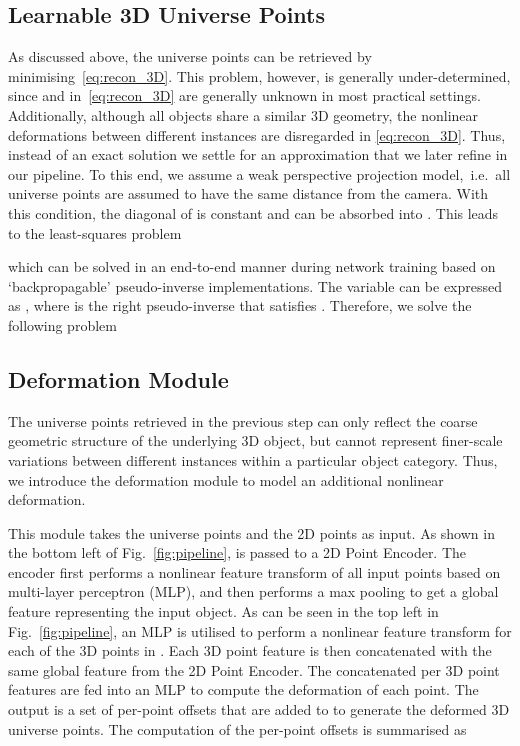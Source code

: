\noindent\subsection{Learnable 3D Universe Points}
As discussed above,
the universe points can be retrieved by minimising~\eqref{eq:recon_3D}.
This problem, however, is generally under-determined, since  and  in~\eqref{eq:recon_3D} are generally unknown in most practical settings.
Additionally, although all objects
share a similar 3D geometry, the nonlinear deformations between different instances are disregarded in \eqref{eq:recon_3D}. Thus, instead of an exact solution we settle for an approximation that we later refine in our pipeline. 
To this end, we assume a weak perspective projection model,~i.e.~all universe points are assumed to have the same distance from the camera.
With this condition, the diagonal of  is constant and can be absorbed into 
.
This leads to the least-squares problem

which can be solved in an end-to-end manner during network training based on `backpropagable' pseudo-inverse implementations.
The variable  can be expressed as , where  is the right pseudo-inverse that satisfies .
Therefore, we solve the following problem


\subsection{Deformation Module}
The universe points retrieved in the previous step can only reflect 
the coarse geometric structure of the underlying 3D object, but cannot represent finer-scale variations between different instances within a particular object category. 
Thus, we introduce the deformation module to model an additional nonlinear deformation.

This module takes the universe points  and the 2D points  as input.
As shown in the bottom left of Fig.~\ref{fig:pipeline},  is passed to a 2D Point Encoder.
The encoder first performs a nonlinear feature transform of all input points based on multi-layer perceptron (MLP), and then performs a max pooling to get a global feature representing the input object.
As can be seen in the top left in Fig.~\ref{fig:pipeline}, an MLP is utilised  to perform a nonlinear feature transform for each of the 3D points in .
Each 3D point feature is then concatenated with the same global feature from the 2D Point Encoder.
The concatenated per 3D point features are fed into an MLP 
to compute the deformation of each point.
The output is a set of per-point offsets  that
are added to  to generate the deformed 3D universe points. 
The computation of the per-point offsets is summarised as 

